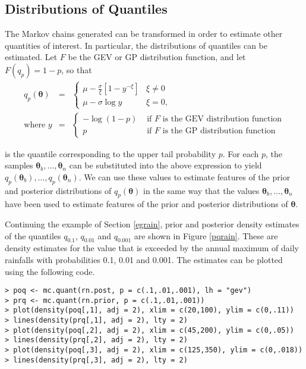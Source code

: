 \documentclass[11pt,a4paper]{article}
\newcommand{\bs}{\boldsymbol}
\begin{document}
\subsection{Distributions of Quantiles}
\label{quantiles}

The Markov chains generated can be transformed in order to estimate
other quantities of interest.  In particular, the distributions of
quantiles can be estimated.  Let $F$ be the GEV or GP distribution function,
and let $F(q_p) = 1-p$, so that
\begin{eqnarray*}
q_p(\bs{\theta}) &=& 
\begin{cases}
  \mu - \frac{\sigma}{\xi}[1 - y^{-\xi}] & \xi \neq 0 \\ 
  \mu - \sigma \log y & \xi = 0,
\end{cases}
\\
\text{where } y &=&
\begin{cases}
  - \log (1-p) & \text{ if $F$ is the GEV distribution function}\\
  p & \text{ if $F$ is the GP distribution function}
\end{cases}
\end{eqnarray*}

is the quantile corresponding to the upper tail probability $p$.  For
each $p$, the samples $\bs{\theta}_b, \dots, \bs{\theta}_n$ can be
substituted into the above expression to yield $q_p(\bs{\theta}_b),
\dots, q_p(\bs{\theta}_n)$.  We can use these values to estimate
features of the prior and posterior distributions of
$q_p(\bs{\theta})$ in the same way that the values $\bs{\theta}_b,
\dots, \bs{\theta}_n$ have been used to estimate features of the prior
and posterior distributions of $\bs{\theta}$.

Continuing the example of Section \ref{egrain}, prior and posterior
density estimates of the quantiles $q_{0.1}$, $q_{0.01}$ and
$q_{0.001}$ are shown in Figure \ref{pqrain}.  These are density
estimates for the value that is exceeded by the annual maximum of
daily rainfalls with probabilities 0.1, 0.01 and 0.001.  The estimates
can be plotted using the following code.

\begin{verbatim}
> poq <- mc.quant(rn.post, p = c(.1,.01,.001), lh = "gev")
> prq <- mc.quant(rn.prior, p = c(.1,.01,.001))
> plot(density(poq[,1], adj = 2), xlim = c(20,100), ylim = c(0,.11))
> lines(density(prq[,1], adj = 2), lty = 2)
> plot(density(poq[,2], adj = 2), xlim = c(45,200), ylim = c(0,.05))
> lines(density(prq[,2], adj = 2), lty = 2)
> plot(density(poq[,3], adj = 2), xlim = c(125,350), ylim = c(0,.018))
> lines(density(prq[,3], adj = 2), lty = 2)
\end{verbatim}
\end{document}
